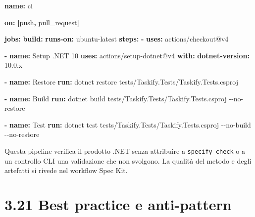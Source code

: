 \documentclass[
  italian,
  10pt,
]{book}
\newenvironment{Shaded}{\begin{snugshade}}{\end{snugshade}}
\newcommand{\AttributeTok}[1]{\textcolor[rgb]{0.13,0.29,0.53}{#1}}
\newcommand{\FunctionTok}[1]{\textcolor[rgb]{0.13,0.29,0.53}{\textbf{#1}}}
\newcommand{\KeywordTok}[1]{\textcolor[rgb]{0.13,0.29,0.53}{\textbf{#1}}}
\newcommand{\StringTok}[1]{\textcolor[rgb]{0.31,0.60,0.02}{#1}}
\begin{document}
\begin{Shaded}
\begin{Highlighting}[]
\FunctionTok{name}\KeywordTok{:}\AttributeTok{ ci}

\FunctionTok{on}\KeywordTok{:}\AttributeTok{ }\KeywordTok{[}\AttributeTok{push}\KeywordTok{,}\AttributeTok{ pull\_request}\KeywordTok{]}

\FunctionTok{jobs}\KeywordTok{:}
\AttributeTok{  }\FunctionTok{build}\KeywordTok{:}
\AttributeTok{    }\FunctionTok{runs{-}on}\KeywordTok{:}\AttributeTok{ ubuntu{-}latest}
\AttributeTok{    }\FunctionTok{steps}\KeywordTok{:}
\AttributeTok{      }\KeywordTok{{-} }\FunctionTok{uses}\KeywordTok{:}\AttributeTok{ actions/checkout@v4}

\AttributeTok{      }\KeywordTok{{-} }\FunctionTok{name}\KeywordTok{:}\AttributeTok{ Setup .NET 10}
\AttributeTok{        }\FunctionTok{uses}\KeywordTok{:}\AttributeTok{ actions/setup{-}dotnet@v4}
\AttributeTok{        }\FunctionTok{with}\KeywordTok{:}
\AttributeTok{          }\FunctionTok{dotnet{-}version}\KeywordTok{:}\AttributeTok{ }\StringTok{\textquotesingle{}10.0.x\textquotesingle{}}

\AttributeTok{      }\KeywordTok{{-} }\FunctionTok{name}\KeywordTok{:}\AttributeTok{ Restore}
\AttributeTok{        }\FunctionTok{run}\KeywordTok{:}\AttributeTok{ dotnet restore tests/Taskify.Tests/Taskify.Tests.csproj}

\AttributeTok{      }\KeywordTok{{-} }\FunctionTok{name}\KeywordTok{:}\AttributeTok{ Build}
\AttributeTok{        }\FunctionTok{run}\KeywordTok{:}\AttributeTok{ dotnet build tests/Taskify.Tests/Taskify.Tests.csproj {-}{-}no{-}restore}

\AttributeTok{      }\KeywordTok{{-} }\FunctionTok{name}\KeywordTok{:}\AttributeTok{ Test}
\AttributeTok{        }\FunctionTok{run}\KeywordTok{:}\AttributeTok{ dotnet test tests/Taskify.Tests/Taskify.Tests.csproj {-}{-}no{-}build {-}{-}no{-}restore}
\end{Highlighting}
\end{Shaded}

Questa pipeline verifica il prodotto .NET senza attribuire a
\texttt{specify\ check} o a un controllo CLI una validazione che non
svolgono. La qualità del metodo e degli artefatti si rivede nel workflow
Spec Kit.

\section{3.21 Best practice e
anti-pattern}\label{best-practice-e-anti-pattern}
\end{document}

